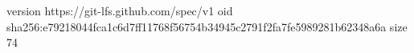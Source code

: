 version https://git-lfs.github.com/spec/v1
oid sha256:e79218044fca1c6d7ff11768f56754b34945c2791f2fa7fe5989281b62348a6a
size 74
